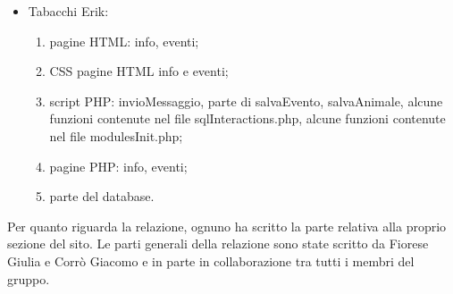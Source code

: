 \begin{itemize}
\begin{enumerate}
        \end{enumerate}
    \item Tabacchi Erik:
        \begin{enumerate}
            \item pagine HTML: info, eventi;
            \item CSS pagine HTML info e eventi;
            \item script PHP: invioMessaggio, parte di salvaEvento, salvaAnimale, alcune funzioni contenute nel file sqlInteractions.php, alcune funzioni contenute nel file modulesInit.php;
            \item pagine PHP: info, eventi;
            \item parte del database.
        \end{enumerate}
\end{itemize}
Per quanto riguarda la relazione, ognuno ha scritto la parte relativa alla proprio sezione del sito. Le parti generali della relazione sono state scritto da Fiorese Giulia e Corrò Giacomo e in parte in collaborazione tra tutti i membri del gruppo.
\pagebreak
